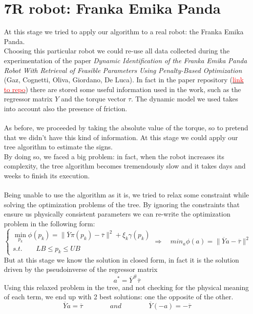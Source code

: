 \documentclass{article}
\begin{document}
\section{7R robot: Franka Emika Panda}
At this stage we tried to apply our algorithm to a real robot: the Franka Emika Panda.\\
Choosing this particular robot we could re-use all data collected during the experimentation of the paper \emph{Dynamic Identification of the Franka Emika Panda Robot With Retrieval of Feasible Parameters Using Penalty-Based Optimization} (Gaz, Cognetti, Oliva, Giordano, De Luca). In fact in the paper repository (\href{https://github.com/marcocognetti/FrankaEmikaPandaDynModel}{\textcolor{red}{link to repo}}) there are stored some useful information used in the work, such as the regressor matrix $Y$ and the torque vector $\tau$. The dynamic model we used takes into account also the presence of friction.\\\\
As before, we proceeded by taking the absolute value of the torque, so to pretend that we didn't have this kind of information. At this stage we could apply our tree algorithm to estimate the signs.\\
By doing so, we faced a big problem: in fact, when the robot increases its complexity, the tree algorithm becomes tremendously slow and it takes days and weeks to finish its execution.\\\\
Being unable to use the algorithm as it is, we tried to relax some constraint while solving the optimization problems of the tree. By ignoring the constraints that ensure us physically consistent parameters we can re-write the optimization problem in the following form:
\[\begin{cases}\min_{p_k}{\phi(p_k)} = \lVert \overline{Y}\pi(p_k)-\overline{\tau} \rVert^2 + \xi_k \gamma(p_k)\\s.t. \qquad LB\le p_k \le UB\end{cases} \Rightarrow \quad min_{a}{\phi(a)} = \lVert \overline{Y}a-\overline{\tau} \rVert^2\]
But at this stage we know the solution in closed form, in fact it is the solution driven by the pseudoinverse of the regressor matrix
\[a^* = \overline{Y}^{\#}\overline{\tau}\]
Using this relaxed problem in the tree, and not checking for the physical meaning of each term, we end up with 2 best solutions: one the opposite of the other.
\[\overline{Y}a = \overline{\tau} \qquad \qquad and \qquad \qquad \overline{Y}(-a) = -\overline{\tau}\]
\end{document}
